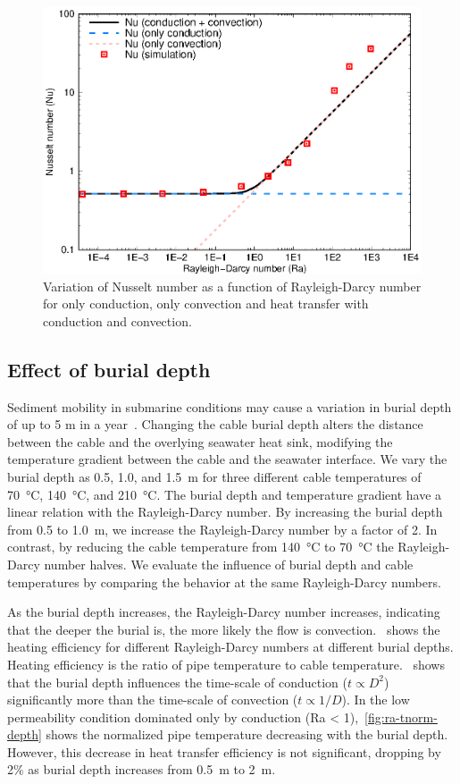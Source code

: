 \documentclass[Journal,letterpaper,InsideFigs]{ascelike-new}
\begin{document}
\begin{figure}
    \centering
    \includegraphics{figs/ra-nu.eps}
    \caption{Variation of Nusselt number as a function of Rayleigh-Darcy number for only conduction, only convection and heat transfer with conduction and convection.}
    \label{fig:ra-nu}
\end{figure}

\subsection*{Effect of burial depth}
Sediment mobility in submarine conditions may cause a variation in burial depth of up to 5 m in a year~\cite{young2001utilizing}. Changing the cable burial depth alters the distance between the cable and the overlying seawater heat sink, modifying the temperature gradient between the cable and the seawater interface. We vary the burial depth as 0.5, 1.0, and \SI{1.5}{\meter} for three different cable temperatures of \SI{70}{\celsius}, \SI{140}{\celsius}, and \SI{210}{\celsius}. The burial depth and temperature gradient have a linear relation with the Rayleigh-Darcy number. By increasing the burial depth from 0.5 to \SI{1.0}{\meter}, we increase the Rayleigh-Darcy number by a factor of 2. In contrast, by reducing the cable temperature from \SI{140}{\celsius} to \SI{70}{\celsius} the Rayleigh-Darcy number halves. We evaluate the influence of burial depth and cable temperatures by comparing the behavior at the same Rayleigh-Darcy numbers.

As the burial depth increases, the Rayleigh-Darcy number increases, indicating that the deeper the burial is, the more likely the flow is convection.~ shows the heating efficiency for different Rayleigh-Darcy numbers at different burial depths. Heating efficiency is the ratio of pipe temperature to cable temperature.~ shows that the burial depth influences the time-scale of conduction  ($t \propto D^2$) significantly more than the time-scale of convection ($t \propto 1/D$). In the low permeability condition dominated only by conduction (Ra < 1),~\cref{fig:ra-tnorm-depth} shows the normalized pipe temperature decreasing with the burial depth. However, this decrease in heat transfer efficiency is not significant, dropping by 2\% as burial depth increases from \SI{0.5}{\meter} to \SI{2}{\meter}.
\end{document}
